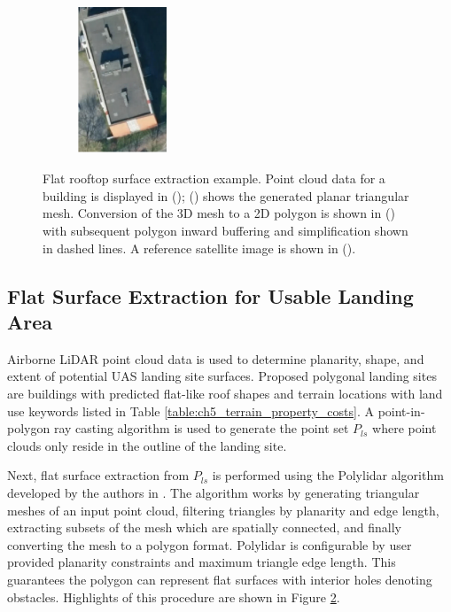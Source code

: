 \begin{figure}[t]
\begin{subfigure}[b]{0.5\linewidth}
    \centering\includegraphics[width=75pt,height=125pt]{chapter_5_mapping/imgs/74200284_satellite_simple.pdf}
    \caption{\label{fig:ch5_satellite_example}}
  \end{subfigure}%
  \caption[Flat surface extraction from rooftops]{Flat rooftop surface extraction example. Point cloud data for a building is displayed in (); () shows the generated planar triangular mesh.  Conversion of the 3D mesh to a 2D polygon is shown in () with subsequent polygon inward buffering and simplification shown in dashed lines.  A reference satellite image is shown in ().}
  \label{fig:ch5_example_usable}
\end{figure}

\subsection{Flat Surface Extraction for Usable Landing Area}\label{sec:ch5_usable_area}

Airborne LiDAR point cloud data is used to determine planarity, shape, and extent of potential UAS landing site surfaces.  %
Proposed polygonal landing sites are buildings with predicted flat-like roof shapes and terrain locations with land use keywords listed in Table \ref{table:ch5_terrain_property_costs}.  A point-in-polygon ray casting algorithm is used to generate the point set $P_{ls}$ \cite{samosky_sectionviewsystem_1993} where point clouds only reside in the outline of the landing site. 

Next, flat surface extraction from $P_{ls}$ is performed using the Polylidar algorithm developed by the authors in \cite{castagno_polylidar3d_2020}. The algorithm works by generating triangular meshes of an input point cloud, filtering triangles by planarity and edge length, extracting subsets of the mesh which are spatially connected, and finally converting the mesh to a polygon format. Polylidar is configurable by user provided planarity constraints and maximum triangle edge length. This guarantees the polygon can represent flat surfaces with interior holes denoting obstacles. Highlights of this procedure are shown in Figure \ref{fig:ch5_example_usable}. 

